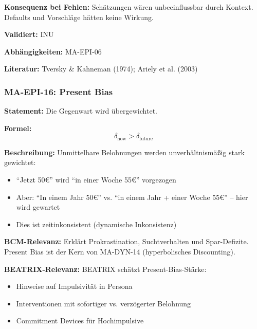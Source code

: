 \textbf{Konsequenz bei Fehlen:}
Schätzungen wären unbeeinflussbar durch Kontext. Defaults und Vorschläge hätten keine Wirkung.

\textbf{Validiert:} INU

\textbf{Abhängigkeiten:} MA-EPI-06

\textbf{Literatur:} Tversky \& Kahneman (1974); Ariely et al. (2003)



\subsubsection*{MA-EPI-16: Present Bias}

\textbf{Statement:} Die Gegenwart wird übergewichtet.

\textbf{Formel:}
\begin{equation}
\delta_{\text{now}} > \delta_{\text{future}}
\end{equation}

\textbf{Beschreibung:}
Unmittelbare Belohnungen werden unverhältnismäßig stark gewichtet:
\begin{itemize}
    \item ``Jetzt 50€'' wird ``in einer Woche 55€'' vorgezogen
    \item Aber: ``In einem Jahr 50€'' vs. ``in einem Jahr + einer Woche 55€'' -- hier wird gewartet
    \item Dies ist zeitinkonsistent (dynamische Inkonsistenz)
\end{itemize}

\textbf{BCM-Relevanz:}
Erklärt Prokrastination, Suchtverhalten und Spar-Defizite. Present Bias ist der Kern von MA-DYN-14 (hyperbolisches Discounting).

\textbf{BEATRIX-Relevanz:}
BEATRIX schätzt Present-Bias-Stärke:
\begin{itemize}
    \item Hinweise auf Impulsivität in Persona
    \item Interventionen mit sofortiger vs. verzögerter Belohnung
    \item Commitment Devices für Hochimpulsive
\end{itemize}


